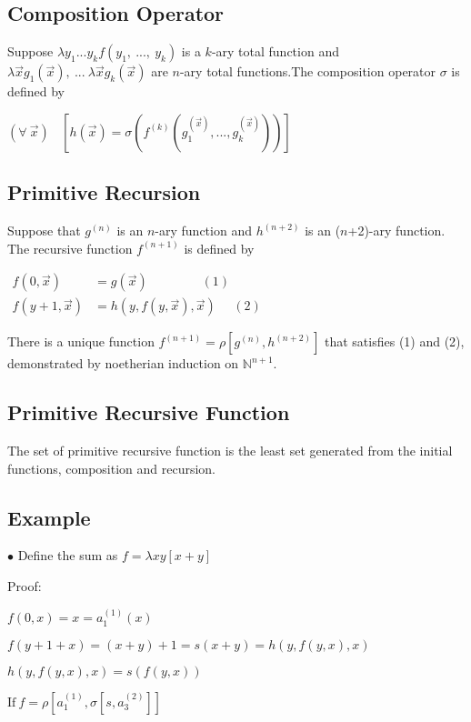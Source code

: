 \subsection{Composition Operator}
Suppose $\lambda y_1...y_k f(y_1,\ ...,\ y_k)$ is a $k$-ary total function and $\lambda \overrightarrow x g_1(\overrightarrow x),\ ...\ \lambda \overrightarrow x g_k(\overrightarrow x)$ are $n$-ary total functions.The composition operator $\sigma$ is defined by 
\begin{center}
	$
	(\forall \ \overrightarrow x)\ \ \ \ [h(\overrightarrow x) = \sigma (f^{(k)}(g_1^{(\overrightarrow x)},...,g_k^{(\overrightarrow x)} ))]
	$
\end{center}
\subsection{Primitive Recursion}
Suppose that $g^{(n)}$ is an $n$-ary function and $h^{(n+2)}$ is an ($n$+2)-ary function. The recursive function $f^{(n+1)}$ is defined by
\begin{center}
	$\begin{aligned}
	f(0, \overrightarrow x) &= g(\overrightarrow x)\ \ \ \ \ \ \ \ \ \ \ \ \ \ \ \ \ \ \ (1)          \\
	f(y+1, \overrightarrow x) &= h(y, f(y, \overrightarrow x),\overrightarrow x)\ \ \ \ \ \   (2)
	\end{aligned}$
\end{center}
There is a unique function $f^{(n+1)} = \rho [g^{(n)},h^{(n+2)}]$ that satisfies (1) and (2), demonstrated by noetherian induction on $\mathbb{N}^{n+1}$.
 
\subsection{Primitive Recursive Function}
The set of primitive recursive function is the least set generated from the initial functions, composition and recursion.
\subsection{Example}
$\bullet$ Define the sum as  $f = \lambda xy[x+y]$

Proof: 

$
f(0, x) = x = a_1^{(1)}(x)
$

$
f(y+1 +x) = (x+y)+1 = s(x+y) = h(y, f(y,x), x) 
$

$
h(y, f(y,x), x) = s(f(y,x))
$

$
\text{If}\  f = \rho [a_1^{(1)},\sigma [s, a_3^{(2)}]]
$

